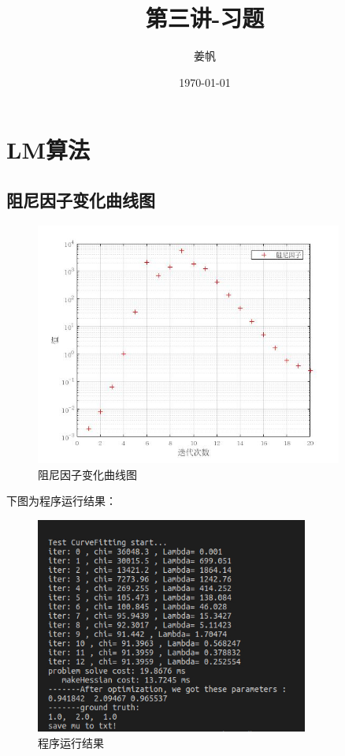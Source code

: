 \documentclass[UTF8]{ctexart}
\title{第三讲-习题}
\author{姜帆}
\date{\today}
\begin{document}
\maketitle
\tableofcontents
\newpage
\section{LM算法}
\subsection{阻尼因子变化曲线图}
\begin{figure}[H]
\centering
\includegraphics[width=0.9\textwidth]{mu1_g.jpg}    
\caption{阻尼因子变化曲线图}
\label{img0}
\end{figure}
\indent 下图为程序运行结果：\\
\begin{figure}[H]
\centering
\includegraphics[width=0.8\textwidth]{mu1.jpg}    
\caption{程序运行结果}
\label{imga}
\end{figure}
\end{document}
